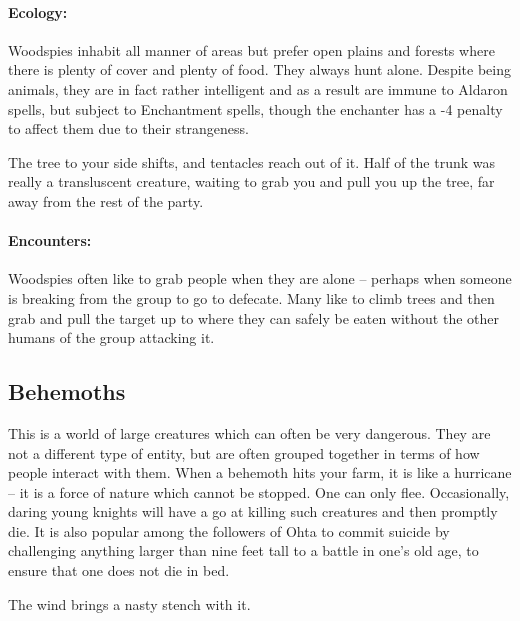 \begin{multicols}{2}
\paragraph{Ecology:} Woodspies inhabit all manner of areas but prefer open plains and forests where there is plenty of cover and plenty of food.  They always hunt alone.  Despite being animals, they are in fact rather intelligent and as a result are immune to Aldaron spells, but subject to Enchantment spells, though the enchanter has a -4 penalty to affect them due to their strangeness.

\begin{boxtext}

	The tree to your side shifts, and tentacles reach out of it.  Half of the trunk was really a transluscent creature, waiting to grab you and pull you up the tree, far away from the rest of the party.

\end{boxtext}

\paragraph{Encounters:} Woodspies often like to grab people when they are alone -- perhaps when someone is breaking from the group to go to defecate.  Many like to climb trees and then grab and pull the target up to where they can safely be eaten without the other humans of the group attacking it.

\subsection{Behemoths}

This is a world of large creatures which can often be very dangerous.  They are not a different type of entity, but are often grouped together in terms of how people interact with them.  When a behemoth hits your farm, it is like a hurricane -- it is a force of nature which cannot be stopped.  One can only flee.  Occasionally, daring young knights will have a go at killing such creatures and then promptly die.  It is also popular among the followers of Ohta to commit suicide by challenging anything larger than nine feet tall to a battle in one's old age, to ensure that one does not die in bed.

\label{basilisk}
\basilisk

\begin{boxtext}

	The wind brings a nasty stench with it.


\end{boxtext}
\end{multicols}

